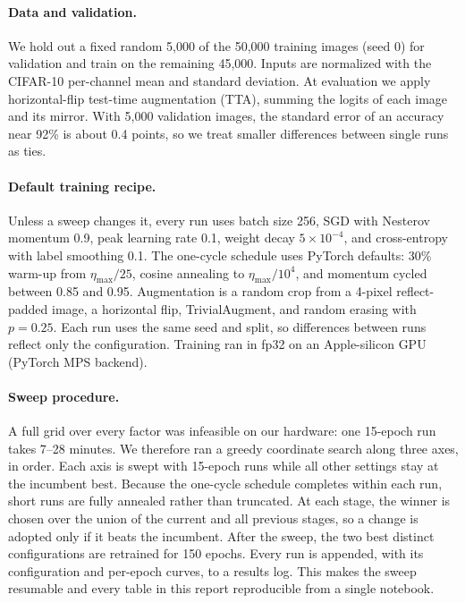 \documentclass[letterpaper]{article} %
\begin{document}
\paragraph{Data and validation.}
We hold out a fixed random 5{,}000 of the 50{,}000 training images (seed 0) for validation and train on the remaining 45{,}000. Inputs are normalized with the CIFAR-10 per-channel mean and standard deviation. At evaluation we apply horizontal-flip test-time augmentation (TTA), summing the logits of each image and its mirror. With 5{,}000 validation images, the standard error of an accuracy near 92\% is about 0.4 points, so we treat smaller differences between single runs as ties.

\paragraph{Default training recipe.}
Unless a sweep changes it, every run uses batch size 256, SGD with Nesterov momentum 0.9, peak learning rate 0.1, weight decay $5\times10^{-4}$, and cross-entropy with label smoothing 0.1. The one-cycle schedule uses PyTorch defaults: 30\% warm-up from $\eta_{\max}/25$, cosine annealing to $\eta_{\max}/10^{4}$, and momentum cycled between 0.85 and 0.95. Augmentation is a random crop from a 4-pixel reflect-padded image, a horizontal flip, TrivialAugment, and random erasing with $p=0.25$. Each run uses the same seed and split, so differences between runs reflect only the configuration. Training ran in fp32 on an Apple-silicon GPU (PyTorch MPS backend).

\paragraph{Sweep procedure.}
A full grid over every factor was infeasible on our hardware: one 15-epoch run takes 7--28 minutes. We therefore ran a greedy coordinate search along three axes, in order. Each axis is swept with 15-epoch runs while all other settings stay at the incumbent best. Because the one-cycle schedule completes within each run, short runs are fully annealed rather than truncated. At each stage, the winner is chosen over the union of the current and all previous stages, so a change is adopted only if it beats the incumbent. After the sweep, the two best distinct configurations are retrained for 150 epochs. Every run is appended, with its configuration and per-epoch curves, to a results log. This makes the sweep resumable and every table in this report reproducible from a single notebook.
\end{document}

